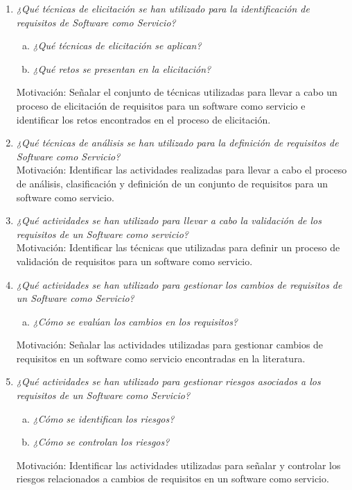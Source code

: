 \documentclass{article}
\begin{document}
\begin{enumerate}[P 1.-]
  \item\emph{¿Qué técnicas de elicitación se han utilizado para la identificación de requisitos de Software como Servicio?}
  \begin{enumerate}[(a)]
  \item \emph{¿Qué técnicas de elicitación se aplican?}
  \item \emph{¿Qué retos se presentan en la elicitación?}
  \end{enumerate}
  Motivación: Señalar el conjunto de técnicas utilizadas para llevar a cabo un proceso de elicitación de requisitos para un software como servicio e identificar los retos encontrados en el proceso de elicitación. 
  
  \item\emph{¿Qué técnicas de análisis se han utilizado para la definición de requisitos de Software como Servicio?}\\
  Motivación: Identificar las actividades realizadas para llevar a cabo el proceso de análisis, clasificación y definición de un conjunto de requisitos para un software como servicio.

  \item\emph{¿Qué actividades se han utilizado para llevar a cabo la validación de los requisitos de un Software como servicio?}\\
  Motivación: Identificar las técnicas que utilizadas para definir un proceso de validación de requisitos para un software como servicio.

  \item\emph{¿Qué actividades se han utilizado para gestionar los cambios de requisitos de un Software como Servicio?}
  \begin{enumerate}[(a)]
  \item \emph{¿Cómo se evalúan los cambios en los requisitos?}\
  \end{enumerate}
  Motivación: Señalar las actividades utilizadas para gestionar cambios de requisitos en un software como servicio encontradas en la literatura.
            
  \item\emph{¿Qué actividades se han utilizado para gestionar riesgos asociados a los requisitos de un Software como Servicio?}
  \begin{enumerate}[(a)]
  \item \emph{¿Cómo se identifican los riesgos?}
  \item \emph{¿Cómo se controlan los riesgos?}
  \end{enumerate}
  Motivación: Identificar las actividades utilizadas para señalar y controlar los riesgos relacionados a cambios de requisitos en un software como servicio. 
  

\end{enumerate}
\end{document}
